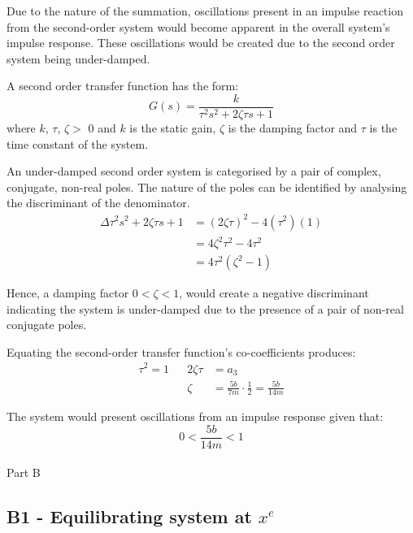 \documentclass[a4paper,10pt,reqno]{amsart}
\makeatletter
\def\section{\@startsection{section}{1}%
  \z@{.7\linespacing\@plus\linespacing}{.5\linespacing}%
  {\bfseries\scshape\centering}}
\numberwithin{equation}{section}
\makeatother
\begin{document}
\par Due to the nature of the summation, oscillations present in an impulse reaction from the second-order system would become apparent in the overall system's impulse response. These oscillations would be created due to the second order system being under-damped.
\\
\par A second order transfer function has the form:
\begin{equation}
    G(s) = \frac{k}{\tau^2s^2+2\zeta\tau s+1}
\end{equation}
where $k$, $\tau$, $\zeta >$ 0 and $k$ is the static gain, $\zeta$ is the damping factor and $\tau$ is the time constant of the system.
\par An under-damped second order system is categorised by a pair of complex, conjugate, non-real poles. The nature of the poles can be identified by analysing the discriminant of the denominator.
\begin{align*}
    \Delta\tau^2s^2+2\zeta\tau s+1&=(2\zeta\tau)^2 - 4(\tau^2)(1)
    \\
    &=4\zeta^2\tau^2-4\tau^2
    \\
    &=4\tau^2(\zeta^2-1)
\end{align*}

Hence, a damping factor $0 < \zeta < 1$, would create a negative discriminant indicating the system is under-damped due to the presence of a pair of non-real conjugate poles.
\\
\par Equating the second-order transfer function's co-coefficients produces:
\begin{align*}
    \tau^2=1 && 2\zeta\tau&=a_3
    \\
    && \zeta &= \frac{5b}{7m} \cdot \frac{1}{2} = \frac{5b}{14m}
\end{align*}

\par The system would present oscillations from an impulse response given that:
\begin{equation*}
    0 < \frac{5b}{14m} < 1
\end{equation*}
\\
\section{Part B}

\subsection{B1 - Equilibrating system at $x^e$}
\end{document}
